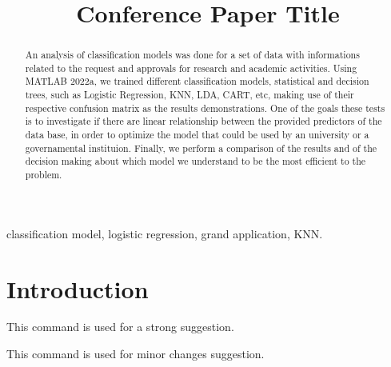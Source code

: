 \documentclass[conference]{IEEEtran}
\newcommand{\reviewNormal}[1]{{\color{yellow} #1}} %
\newcommand{\reviewMinor}[1]{{\color{green} #1}} %
\begin{document}
\title{Conference Paper Title}

\author{
\and
{}
}

\maketitle

\begin{abstract}
An analysis of classification models was done for a set of data with informations related
to the request and approvals for research and academic activities. Using MATLAB 2022a, 
we trained different classification models, statistical and decision trees, such as 
Logistic Regression, KNN, LDA, CART, etc, making use of their respective confusion 
matrix as the results demonstrations. One of the goals these tests is to investigate if 
there are linear relationship between the provided predictors of the data base, in 
order to optimize the model that could be used by an university or a governamental 
instituion. Finally, we perform a comparison of the results and of the decision making
about which model we understand to be the most efficient to the problem.  

\end{abstract}

\begin{IEEEkeywords}
classification model, logistic regression, grand application, KNN.
\end{IEEEkeywords}

\section{Introduction}



\reviewNormal{This command is used for a strong suggestion.}

\reviewMinor{This command is used for minor changes suggestion.}
\end{document}
